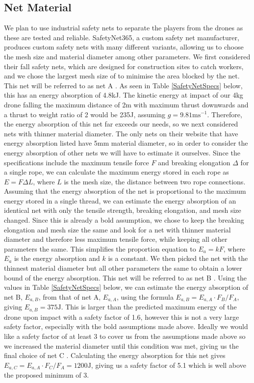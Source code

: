 \documentclass{report_template_oxford}
\begin{document}
\subsection{Net Material}
We plan to use industrial safety nets to separate the players from the drones as these are tested and reliable. SafetyNet365, a custom safety net manufacturer, produces custom safety nets with many different variants, allowing us to choose the mesh size and material diameter among other parameters. We first considered their fall safety nets, which are designed for construction sites to catch workers, and we chose the largest mesh size of to minimise the area blocked by the net. This net will be referred to as net A \cite{testedSafetyNet}. As seen in Table \ref{SafetyNetSpecs} below, this has an energy absorption of 4.8kJ. The kinetic energy at impact of our 4kg drone falling the maximum distance of 2m with maximum thrust downwards and a thrust to weight ratio of 2 would be 235J, assuming $g =9.81\mathrm{ms}^{-1}$. Therefore, the energy absorption of this net far exceeds our needs, so we next considered nets with thinner material diameter. The only nets on their website that have energy absorption listed have 5mm material diameter, so in order to consider the energy absorption of other nets we will have to estimate it ourselves. Since the specifications include the maximum tensile force $F$ and breaking elongation $\Delta$ for a single rope, we can calculate the maximum energy stored in each rope as $E=F\Delta L$, where $L$ is the mesh size, the distance between two rope connections. Assuming that the energy absorption of the net is proportional to the maximum energy stored in a single thread, we can estimate the energy absorption of an identical net with only the tensile strength, breaking elongation, and mesh size changed. Since this is already a bold assumption, we chose to keep the breaking elongation and mesh size the same and look for a net with thinner material diameter and therefore less maximum tensile force, while keeping all other parameters the same. This simplifies the proportion equation to $E_a = k F$, where $E_a$ is the energy absorption and $k$ is a constant. We then picked the net with the thinnest material diameter but all other parameters the same to obtain a lower bound of the energy absorption. This net will be referred to as net B \cite{thinSafetyNet}. Using the values in Table \ref{SafetyNetSpecs} below, we can estimate the energy absorption of net B, $E_{a,B}$, from that of net A, $E_{a,A}$, using the formula $E_{a,B} = E_{a,A} \cdot F_B/F_A$, giving $E_{a,B} = 375\mathrm{J}$. This is larger than the predicted maximum energy of the drone upon impact with a safety factor of 1.6, however this is not a very large safety factor, especially with the bold assumptions made above. Ideally we would like a safety factor of at least 3 to cover us from the assumptions made above so we increased the material diameter until this condition was met, giving us the final choice of net C \cite{usedSafetyNet}. Calculating the energy absorption for this net gives $E_{a,C} = E_{a,A} \cdot F_C/F_A = 1200\mathrm{J}$, giving us a safety factor of 5.1 which is well above the proposed minimum of 3.
\end{document}
